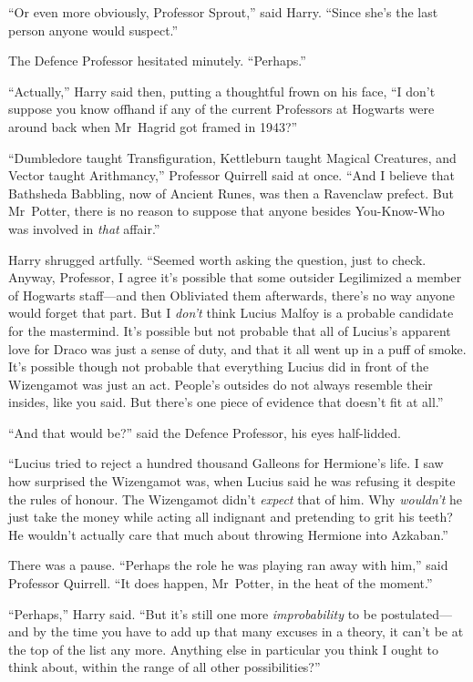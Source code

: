 “Or even more obviously, Professor Sprout,” said Harry. “Since she’s the last person anyone would suspect.”

The Defence Professor hesitated minutely. “Perhaps.”

“Actually,” Harry said then, putting a thoughtful frown on his face, “I don’t suppose you know offhand if any of the current Professors at Hogwarts were around back when Mr~Hagrid got framed in 1943?”

“Dumbledore taught Transfiguration, Kettleburn taught Magical Creatures, and Vector taught Arithmancy,” Professor Quirrell said at once. “And I believe that Bathsheda Babbling, now of Ancient Runes, was then a Ravenclaw prefect. But Mr~Potter, there is no reason to suppose that anyone besides You-Know-Who was involved in \emph{that} affair.”

Harry shrugged artfully. “Seemed worth asking the question, just to check. Anyway, Professor, I agree it’s possible that some outsider Legilimized a member of Hogwarts staff—and then Obliviated them afterwards, there’s no way anyone would forget that part. But I \emph{don’t} think Lucius Malfoy is a probable candidate for the mastermind. It’s possible but not probable that all of Lucius’s apparent love for Draco was just a sense of duty, and that it all went up in a puff of smoke. It’s possible though not probable that everything Lucius did in front of the Wizengamot was just an act. People’s outsides do not always resemble their insides, like you said. But there’s one piece of evidence that doesn’t fit at all.”

“And that would be?” said the Defence Professor, his eyes half-lidded.

“Lucius tried to reject a hundred thousand Galleons for Hermione’s life. I saw how surprised the Wizengamot was, when Lucius said he was refusing it despite the rules of honour. The Wizengamot didn’t \emph{expect} that of him. Why \emph{wouldn’t} he just take the money while acting all indignant and pretending to grit his teeth? He wouldn’t actually care that much about throwing Hermione into Azkaban.”

There was a pause. “Perhaps the role he was playing ran away with him,” said Professor Quirrell. “It does happen, Mr~Potter, in the heat of the moment.”

“Perhaps,” Harry said. “But it’s still one more \emph{improbability} to be postulated—and by the time you have to add up that many excuses in a theory, it can’t be at the top of the list any more. Anything else in particular you think I ought to think about, within the range of all other possibilities?”

